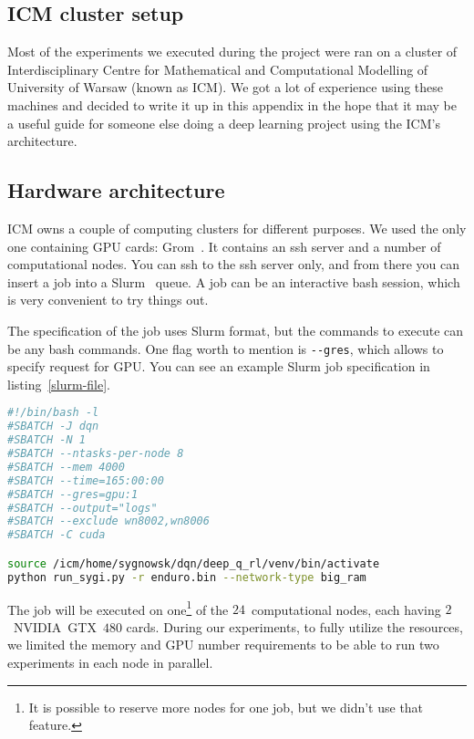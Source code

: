 \begin{appendices}
  
\chapter{ICM cluster setup}\label{icm}
Most of the experiments we executed during the project were ran on a cluster of Interdisciplinary Centre for Mathematical and Computational Modelling of University of Warsaw (known as ICM). We got a lot of experience using these machines and decided to write it up in this appendix in the hope that it may be a useful guide for someone else doing a deep learning project using the ICM's architecture.

\section{Hardware architecture}
  ICM owns a couple of computing clusters for different purposes. We used the only one containing GPU cards: Grom~\cite[in polish]{grom-icm}. It contains an ssh server and a number of computational nodes. You can ssh to the ssh server only, and from there you can insert a job into a Slurm~\cite{slurm} queue. A job can be an interactive bash session, which is very convenient to try things out.
  
  The specification of the job uses Slurm format, but the commands to execute can be any bash commands. One flag worth to mention is \texttt{-{}-gres}, which allows to specify request for GPU. You can see an example Slurm job specification in listing~\ref{slurm-file}.

  \begin{lstlisting}[language=bash, caption={Example Slurm job specification}, label={slurm-file}]
#!/bin/bash -l
#SBATCH -J dqn
#SBATCH -N 1
#SBATCH --ntasks-per-node 8
#SBATCH --mem 4000
#SBATCH --time=165:00:00
#SBATCH --gres=gpu:1
#SBATCH --output="logs"
#SBATCH --exclude wn8002,wn8006
#SBATCH -C cuda

source /icm/home/sygnowsk/dqn/deep_q_rl/venv/bin/activate
python run_sygi.py -r enduro.bin --network-type big_ram
\end{lstlisting}

The job will be executed on one\footnote{It is possible to reserve more nodes for one job, but we didn't use that feature.} of the $24$~computational nodes, each having $2$~NVIDIA~GTX~$480$ cards. During our experiments, to fully utilize the resources, we limited the memory and GPU number requirements to be able to run two experiments in each node in parallel.


\end{appendices}
